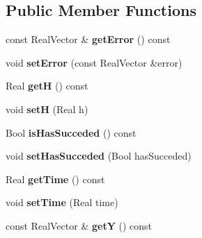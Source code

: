 \subsection*{Public Member Functions}
\begin{DoxyCompactItemize}
\item 
\hypertarget{classSingleRateFESolverData_ac3434371d7fecbe4e03743ce0077cdeb}{
const RealVector \& {\bfseries getError} () const }
\label{classSingleRateFESolverData_ac3434371d7fecbe4e03743ce0077cdeb}

\item 
\hypertarget{classSingleRateFESolverData_a81a42aeacdd1fd83ed0bccef6898ddc2}{
void {\bfseries setError} (const RealVector \&error)}
\label{classSingleRateFESolverData_a81a42aeacdd1fd83ed0bccef6898ddc2}

\item 
\hypertarget{classSingleRateFESolverData_ad6bf6cdcde73d976bb7fa745bc31e354}{
Real {\bfseries getH} () const }
\label{classSingleRateFESolverData_ad6bf6cdcde73d976bb7fa745bc31e354}

\item 
\hypertarget{classSingleRateFESolverData_a29e1329801a0eb8038bb2ffe963760d0}{
void {\bfseries setH} (Real h)}
\label{classSingleRateFESolverData_a29e1329801a0eb8038bb2ffe963760d0}

\item 
\hypertarget{classSingleRateFESolverData_a717b8c79cb9b2c2525b968302f471d3d}{
Bool {\bfseries isHasSucceded} () const }
\label{classSingleRateFESolverData_a717b8c79cb9b2c2525b968302f471d3d}

\item 
\hypertarget{classSingleRateFESolverData_a6f55b5a772d7559f44d30b6ef73ea046}{
void {\bfseries setHasSucceded} (Bool hasSucceded)}
\label{classSingleRateFESolverData_a6f55b5a772d7559f44d30b6ef73ea046}

\item 
\hypertarget{classSingleRateFESolverData_aa0b99b42a8abd1ea09a851e61281157d}{
Real {\bfseries getTime} () const }
\label{classSingleRateFESolverData_aa0b99b42a8abd1ea09a851e61281157d}

\item 
\hypertarget{classSingleRateFESolverData_ac4f7a318943683aab40654d2d5c68d46}{
void {\bfseries setTime} (Real time)}
\label{classSingleRateFESolverData_ac4f7a318943683aab40654d2d5c68d46}

\item 
\hypertarget{classSingleRateFESolverData_a7be74f378da05b81a59b0b2d6983392a}{
const RealVector \& {\bfseries getY} () const }
\label{classSingleRateFESolverData_a7be74f378da05b81a59b0b2d6983392a}


\end{DoxyCompactItemize}
